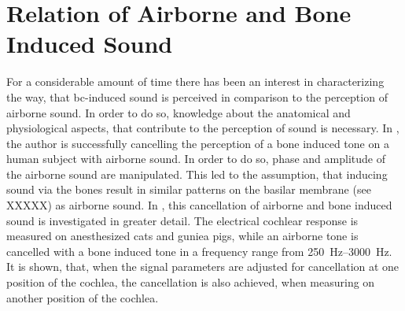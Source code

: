 \section{Relation of Airborne and Bone Induced Sound}
For a considerable amount of time there has been an interest in characterizing the way, that \gls{bc}-induced sound is perceived in comparison to the perception of  airborne sound. In order to do so, knowledge about the anatomical and physiological aspects, that contribute to the perception of sound is necessary.
In \citep{bekesy_1932}, the author is successfully cancelling the perception of a bone induced tone on a human subject with airborne sound. In order to do so, phase and amplitude of the airborne sound are manipulated. This led to the assumption, that inducing sound via the bones result in similar patterns on the basilar membrane (see XXXXX) as airborne sound.
In \citep{lowy_1942}, this cancellation of airborne and bone induced sound is investigated in greater detail. The electrical cochlear response is measured on anesthesized cats and guniea pigs, while an airborne tone is cancelled with a bone induced tone in a frequency range from \SIrange{250}{3000}{\hertz}. It is shown, that, when the signal parameters are adjusted for cancellation at one position of the cochlea, the cancellation is also achieved, when measuring on another position of the cochlea. 